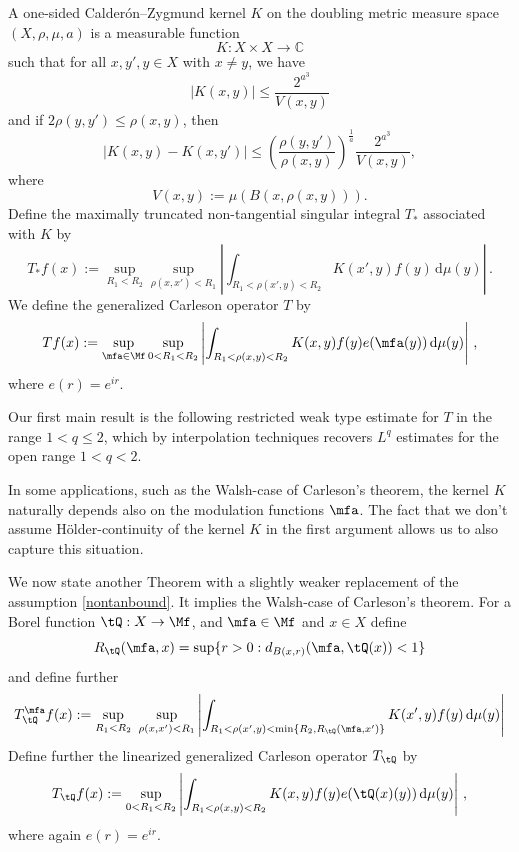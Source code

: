 A one-sided Calder\'on--Zygmund kernel $K$ on the doubling metric measure space $(X, \rho, \mu, a)$ is a measurable function
\begin{equation}\label{eqkernel0}
  K:X\times X\to \mathbb{C}
\end{equation}
such that for all $x,y',y\in X$ with $x\neq y$, we have
\begin{equation}\label{eqkernel-size}
    |K(x,y)| \leq \frac{2^{a^3}}{V(x,y)}
\end{equation}
and if $2\rho(y,y') \leq \rho(x,y)$, then
\begin{equation}
  \label{eqkernel-y-smooth}
  |K(x,y) - K(x,y')| \leq \left(\frac{\rho(y,y')}{\rho(x,y)}\right)^{\frac{1}{a}}\frac{2^{a^3}}{V(x,y)},
\end{equation}
where \[V(x,y):=\mu(B(x,\rho(x,y))).\]
Define the maximally truncated non-tangential singular integral $T_{*}$ associated with $K$ by
\begin{equation}
    \label{def-tang-unm-op}
    T_{*}f(x):=\sup_{R_1 < R_2} \sup_{\rho(x,x')<R_1} \left|\int_{R_1< \rho(x',y) < R_2} K(x',y) f(y) \, \mathrm{d}\mu(y) \right|\,.
\end{equation}
We define the generalized Carleson operator $T$ by
\begin{equation}
    \label{def-main-op}
    Tf(x):=\sup_{\mfa\in\Mf} \sup_{0 < R_1 < R_2}\left| \int_{R_1 < \rho(x,y) < R_2} K(x,y) f(y) e(\mfa(y)) \, \mathrm{d}\mu(y) \right|\, ,
\end{equation}
where $e(r)=e^{ir}$.

Our first main result is the following restricted weak type estimate for $T$ in the range $1<q\le 2$,
which by interpolation techniques recovers $L^q$ estimates for the open range $1<q<2$.

In some applications, such as the Walsh-case of Carleson's theorem, the kernel $K$ naturally depends also on the modulation functions $\mfa$.
The fact that we don't assume H\"older-continuity of the kernel $K$ in the first argument allows us to also capture this situation.

We now state another Theorem with a slightly weaker replacement of the assumption \eqref{nontanbound}.
It implies the Walsh-case of Carleson's theorem.
For a Borel function $\tQ:X\to \Mf$, and $\mfa \in \Mf$ and $x\in X$ define
\begin{equation}
    R_{\tQ}(\mfa,x)=\sup\{r>0:d_{B(x,r)}(\mfa, \tQ(x))<1\}
\end{equation}
and define further
\begin{equation}
    \label{def-lin-star-op}
    T_{\tQ}^\mfa f(x):=\sup_{R_1<R_2} \ \sup_{\rho(x,x')<R_1}
    \left|\int_{R_1< \rho(x',y) < \min\{R_2, R_{\tQ}(\mfa,x')\}} K(x',y) f(y) \, \mathrm{d}\mu(y) \right|
\end{equation}
Define further the linearized generalized Carleson operator $T_\tQ$ by
\begin{equation}
    \label{def-lin-main-op}
    T_\tQ f(x):= \sup_{0 < R_1 < R_2}\left| \int_{R_1 < \rho(x,y) < R_2} K(x,y) f(y) e(\tQ(x)(y)) \, \mathrm{d}\mu(y) \right|\, ,
\end{equation}
where again $e(r)=e^{ir}$.

